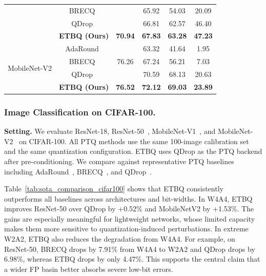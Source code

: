 \documentclass{article}
\begin{document}
\begin{table}[t!]
{\begin{tabular}{lccccc}
& BRECQ~\cite{li-brecq-arxiv-2021}         &                        & 65.92 & 54.03 & 20.09 \\
& QDrop~\cite{wei-qdrop-arxiv-2022}        &                        & 66.81 & 62.57 & 46.40 \\
& \textbf{ETBQ (Ours)}                     & \textbf{70.94}         & \textbf{67.83} & \textbf{63.28} & \textbf{47.23} \\
\midrule
\multirow{4}{*}{MobileNet-V2}
& AdaRound~\cite{nagel-adaround-icml-2020} & \multirow{3}{*}{76.26} & 63.32 & 41.64 &  1.95 \\
& BRECQ~\cite{li-brecq-arxiv-2021}         &                        & 67.24 & 56.21 &  7.03 \\
& QDrop~\cite{wei-qdrop-arxiv-2022}        &                        & 70.59 & 68.13 & 20.63 \\
& \textbf{ETBQ (Ours)}                     & \textbf{76.52}         & \textbf{72.12} & \textbf{69.03} & \textbf{23.89} \\
\bottomrule
\end{tabular}
}
\end{table}

\subsubsection{Image Classification on CIFAR-100.}
\textbf{Setting.}
We evaluate ResNet-18, ResNet-50~\cite{he-resnet-cvpr-2016}, MobileNet-V1~\cite{howard-mbv1-arxiv-2017}, and MobileNet-V2~\cite{sandler-mbv2-cvpr-2018} on CIFAR-100. All PTQ methods use the same 100-image calibration set and the same quantization configuration. ETBQ uses QDrop as the PTQ backend after pre-conditioning. We compare against representative PTQ baselines including AdaRound~\cite{nagel-adaround-icml-2020}, BRECQ~\cite{li-brecq-arxiv-2021}, and QDrop~\cite{wei-qdrop-arxiv-2022}.

Table~\ref{tab:sota_comparison_cifar100} shows that ETBQ consistently outperforms all baselines across architectures and bit-widths. In W4A4, ETBQ improves ResNet-50 over QDrop by +0.52\% and MobileNetV2 by +1.53\%. The gains are especially meaningful for lightweight networks, whose limited capacity makes them more sensitive to quantization-induced perturbations. In extreme W2A2, ETBQ also reduces the degradation from W4A4. For example, on ResNet-50, BRECQ drops by 7.91\% from W4A4 to W2A2 and QDrop drops by 6.98\%, whereas ETBQ drops by only 4.47\%. This supports the central claim that a wider FP basin better absorbs severe low-bit errors.
\end{document}
